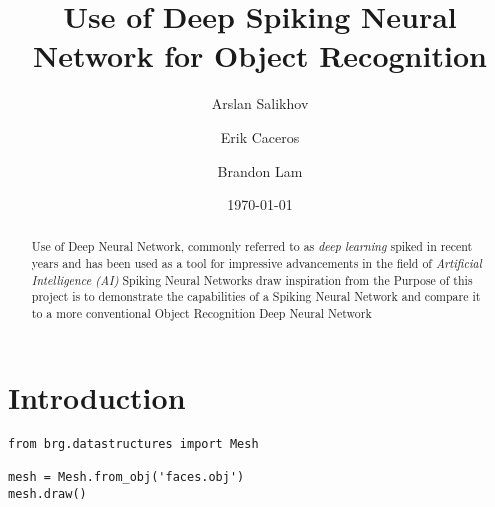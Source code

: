 \documentclass{article}
\title{Use of Deep Spiking Neural Network for Object Recognition}
\author{Arslan Salikhov  \\
	\and 
	Erik Caceros \\
	\and
	Brandon Lam \\
	}
\date{\today}
\begin{document}
\begin{titlingpage}
\maketitle
\end{titlingpage}


\begin{abstract}
Use of Deep Neural Network, commonly referred to as
\textit{deep learning} spiked in recent years and has been used
as a tool for impressive advancements in the field of 
\textit{Artificial Intelligence (AI)}
Spiking Neural Networks draw inspiration from the 
Purpose of this project is to demonstrate the capabilities of a 
Spiking Neural Network and compare it to a more conventional 
Object Recognition Deep Neural Network
\end{abstract}

\section{Introduction}


\lstset{language=Python}
\lstset{frame=lines}
\lstset{basicstyle=\footnotesize}
\begin{lstlisting}
from brg.datastructures import Mesh
 
mesh = Mesh.from_obj('faces.obj')
mesh.draw()
\end{lstlisting}
\end{document}
